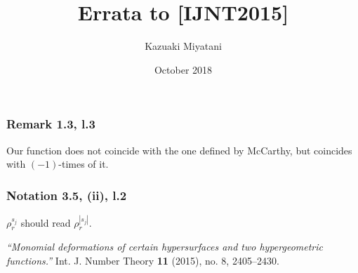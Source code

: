 \documentclass{article}
\title{Errata to [IJNT2015]}
\author{Kazuaki Miyatani}
\date{October 2018}
\begin{document}
\maketitle
    
\subsubsection*{Remark 1.3, l.3}
Our function does not coincide with the one defined by McCarthy,
but coincides with $(-1)$-times of it.

\subsubsection*{Notation 3.5, (ii), l.2}
$\rho_r^{s_j}$ should read $\rho_r^{|s_j|}$.

\begin{thebibliography}{99}
\textit{``Monomial deformations of certain hypersurfaces and two hypergeometric functions.''}
Int. J. Number Theory \textbf{11} (2015), no. 8, 2405--2430. 
\end{thebibliography}
\end{document}
